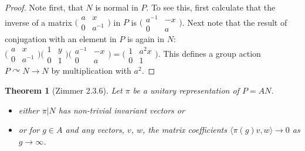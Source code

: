 \documentclass[
  12pt
]{article}
\numberwithin{equation}{section}
\newtheorem{thm}{Theorem}[section]
\theoremstyle{plain}
\newtheorem*{proof}{Proof}
\newcommand{\mpi}{\ensuremath{\pi}\xspace}
\newcommand{\ipmatrix}[1]{%
\ensuremath{\big(\begin{smallmatrix} #1 \end{smallmatrix}\big)}\xspace}
\begin{document}
\begin{proof}
    Note first, that $N$ is normal in $P$. To see this, first calculate that the
    inverse of a matrix $\ipmatrix{ a & x \\ 0 & a^{-1} }$ in $P$ is $\ipmatrix{
    a^{-1} & -x \\ 0 & a }$. Next note that the result of conjugation with an
    element in $P$ is again in $N$: $\ipmatrix{ a & x \\ 0 & a^{-1} } \ipmatrix{1 &
    y \\ 0 & 1} \ipmatrix{ a^{-1} & -x \\ 0 & a } = \ipmatrix{1 & a^2x \\ 0 & 1}$.
    This defines a group action $P \curvearrowright N \rightarrow N$ by
    multiplication with $a^2$.
  \end{proof}

  \begin{thm}[Zimmer 2.3.6]
    \label{thm:2.3.6}
    Let \mpi be  a unitary representation of $P = AN$.
    \begin{itemize}
      \item either $\pi|N$ has non-trivial invariant vectors or
      \item or for $g \in A$ and any vectors, $v$, $w$, the matrix coefficients
        $\langle \pi(g)v, w \rangle \rightarrow 0$ as $g \rightarrow \infty$.
    \end{itemize}
  \end{thm}
\end{document}
